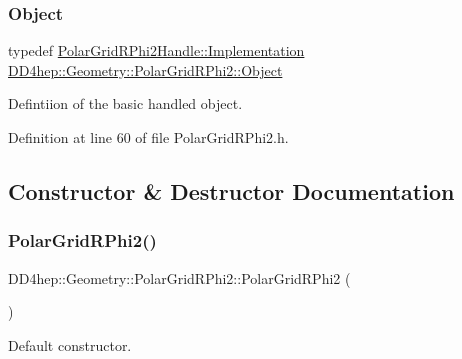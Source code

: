 \subsubsection{\texorpdfstring{Object}{Object}}
{\footnotesize\ttfamily typedef \hyperlink{class_d_d4hep_1_1_handle_ad7ff728a25806079516b8965b9113f1a}{Polar\+Grid\+R\+Phi2\+Handle\+::\+Implementation} \hyperlink{class_d_d4hep_1_1_geometry_1_1_polar_grid_r_phi2_a1067131b00d726a9739132de2eea6d86}{D\+D4hep\+::\+Geometry\+::\+Polar\+Grid\+R\+Phi2\+::\+Object}}



Defintiion of the basic handled object. 



Definition at line 60 of file Polar\+Grid\+R\+Phi2.\+h.



\subsection{Constructor \& Destructor Documentation}
\hypertarget{class_d_d4hep_1_1_geometry_1_1_polar_grid_r_phi2_adc3208e053f06a4adbf8f4fa4544910b}{}\label{class_d_d4hep_1_1_geometry_1_1_polar_grid_r_phi2_adc3208e053f06a4adbf8f4fa4544910b} 
\subsubsection{\texorpdfstring{Polar\+Grid\+R\+Phi2()}{PolarGridRPhi2()}\hspace{0.1cm}{\footnotesize\ttfamily [1/5]}}
{\footnotesize\ttfamily D\+D4hep\+::\+Geometry\+::\+Polar\+Grid\+R\+Phi2\+::\+Polar\+Grid\+R\+Phi2 (\begin{DoxyParamCaption}{ }\end{DoxyParamCaption})\hspace{0.3cm}{\ttfamily [default]}}



Default constructor. 

\hypertarget{class_d_d4hep_1_1_geometry_1_1_polar_grid_r_phi2_a26204958b319557a5cff82dc61b591e0}{}\label{class_d_d4hep_1_1_geometry_1_1_polar_grid_r_phi2_a26204958b319557a5cff82dc61b591e0} 
